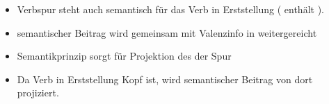 {{
\begin{itemize}
\item Verbspur steht auch semantisch für das Verb in Erststellung ( enthält \cont).
\pause
\item semantischer Beitrag wird gemeinsam mit Valenzinfo in \dsl weitergereicht
\pause
\item Semantikprinzip sorgt für Projektion des \contws der Spur
\pause
\item Da Verb in Erststellung Kopf ist, wird semantischer Beitrag von dort projiziert.


\end{itemize}}}
